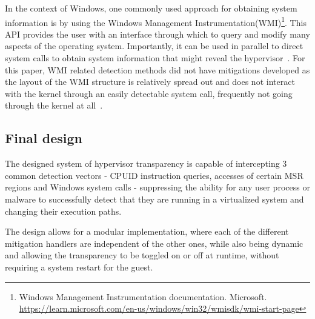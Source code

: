 In the context of Windows, one commonly used approach for obtaining system information is by using the Windows Management Instrumentation(WMI)\footnote{Windows Management Instrumentation documentation. Microsoft. \url{https://learn.microsoft.com/en-us/windows/win32/wmisdk/wmi-start-page}}.
This API provides the user with an interface through which to query and modify many aspects of the operating system. 
Importantly, it can be used in parallel to direct system calls to obtain system information that might reveal the hypervisor~\cite{graeber2015abusing}.
For this paper, WMI related detection methods did not have mitigations developed as the layout of the WMI structure is relatively spread out and 
does not interact with the kernel through an easily detectable system call, frequently not going through the kernel at all~\cite{wmi-structure}.

\subsection{Final design}
The designed system of hypervisor transparency is capable of intercepting 3 common detection vectors - CPUID instruction queries, accesses of certain MSR regions and Windows system calls - 
suppressing the ability for any user process or malware to successfully detect that they are running in a virtualized system and changing their execution paths. 

The design allows for a modular implementation, where each of the different mitigation handlers are independent of the other ones, 
while also being dynamic and allowing the transparency to be toggled on or off at runtime, without requiring a system restart for the guest.





